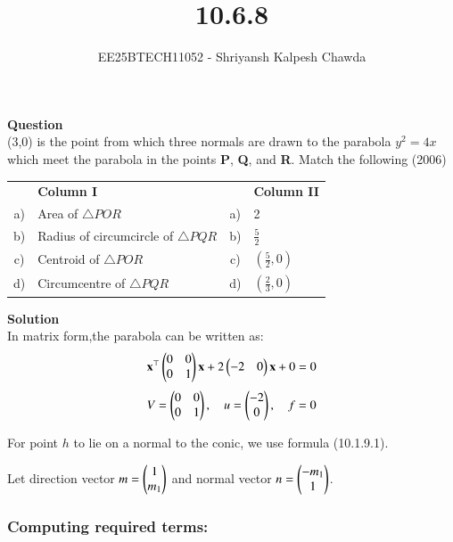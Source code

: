 \documentclass[article]{IEEEtran}
\begin{document}
	\title{10.6.8}
	\author{EE25BTECH11052 - Shriyansh Kalpesh Chawda}
	\maketitle
\textbf{Question}\\
(3,0) is the point from which three normals are drawn to the parabola \( y^2 = 4x \) which meet the parabola in the points \textbf{P}, \textbf{Q}, and \textbf{R}. Match the following \hfill (2006)

\begin{center}
	\begin{tabular}{c l c l}
		\hline
		& \textbf{Column I}  & &\textbf{Column II}  \\

		a) & Area of \( \triangle POR \) & a) & 2 \\
		b) & Radius of circumcircle of \( \triangle PQR \) & b) & \( \frac{5}{2} \) \\
		c) & Centroid of \( \triangle POR \) & c) & \( \left( \frac{5}{2}, 0 \right) \) \\
		d) & Circumcentre of \( \triangle PQR \) & d) & \( \left( \frac{2}{3}, 0 \right) \) \\
		\hline
	\end{tabular}
\end{center}

\textbf{Solution}\\
In matrix form,the parabola can be written as:
\begin{equation}
	\mathbf{x}^\top\begin{pmatrix}0 & 0\\0 & 1\end{pmatrix}\mathbf{x} + 2\begin{pmatrix}-2 & 0\end{pmatrix}\mathbf{x} + 0 = 0
\end{equation}
\begin{equation}
	V = \begin{pmatrix}0 & 0\\0 & 1\end{pmatrix}, \quad u = \begin{pmatrix}-2\\0\end{pmatrix}, \quad f = 0
\end{equation}

For point $h$ to lie on a normal to the conic, we use formula (10.1.9.1).

Let direction vector $m = \begin{pmatrix}1\\m_1\end{pmatrix}$ and normal vector $n = \begin{pmatrix}-m_1\\1\end{pmatrix}$.

\subsubsection*{Computing required terms:}
\end{document}

